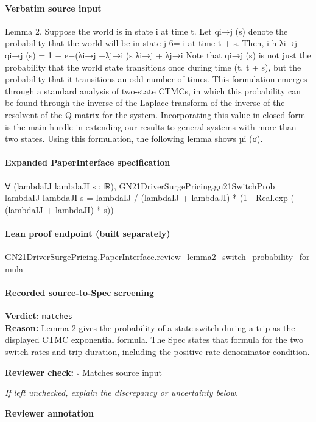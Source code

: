 \documentclass[10pt]{article}
\newcommand{\reviewerbox}{%
  \par\noindent\fbox{\parbox{0.96\linewidth}{\rule{0pt}{0.38in}}}\par
}
\newcommand{\reviewmatch}[1]{%
  \par\noindent\textbf{Reviewer check:} $\square$\; #1\par
  \noindent\emph{If left unchecked, explain the discrepancy or uncertainty below.}\par
}
\begin{document}
\paragraph{Verbatim source input}
\begin{ReviewVerbatim}
Lemma 2. Suppose the world is in state i at time t. Let qi→j (s) denote the probability that the
world will be in state j 6= i at time t + s. Then,
i
h
λi→j
qi→j (s) =
1 − e−(λi→j +λj→i )s
λi→j + λj→i
Note that qi→j (s) is not just the probability that the world state transitions once during time
(t, t + s), but the probability that it transitions an odd number of times. This formulation emerges
through a standard analysis of two-state CTMCs, in which this probability can be found through
the inverse of the Laplace transform of the inverse of the resolvent of the Q-matrix for the system.
Incorporating this value in closed form is the main hurdle in extending our results to general systems
with more than two states. Using this formulation, the following lemma shows µi (σ).
\end{ReviewVerbatim}


\paragraph{Expanded PaperInterface specification}
\begin{ReviewVerbatim}
∀ (lambdaIJ lambdaJI s : ℝ),
  GN21DriverSurgePricing.gn21SwitchProb lambdaIJ lambdaJI s =
    lambdaIJ / (lambdaIJ + lambdaJI) * (1 - Real.exp (-(lambdaIJ + lambdaJI) * s))
\end{ReviewVerbatim}

\paragraph{Lean proof endpoint (built separately)}\begin{ReviewVerbatim}
GN21DriverSurgePricing.PaperInterface.review_lemma2_switch_probability_formula
\end{ReviewVerbatim}

\paragraph{Recorded source-to-Spec screening}
\textbf{Verdict:} \texttt{matches}
\\
\textbf{Reason:} Lemma 2 gives the probability of a state switch during a trip as the displayed CTMC exponential formula. The Spec states that formula for the two switch rates and trip duration, including the positive-rate denominator condition.
\reviewmatch{Matches source input}
\noindent\textbf{Reviewer annotation}\par
\reviewerbox
\clearpage
\hypertarget{source-claim-ebc105656e6d5688}{}
\end{document}
